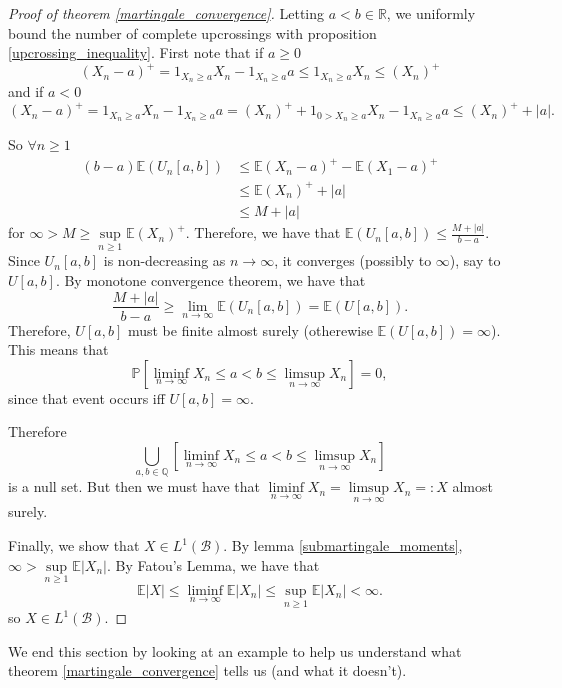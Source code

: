 \begin{proof}[Proof of theorem \ref{martingale_convergence}]
    Letting $a < b \in \mathbb{R}$, we uniformly bound the number of complete upcrossings with proposition \ref{upcrossing_inequality}. First note that if $a \geq 0$ 
    $$(X_{n} - a)^{+} = 1_{X_{n} \geq a}X_{n} -1_{X_{n} \geq a}a \leq 1_{X_{n} \geq a}X_{n} \leq (X_{n})^{+}$$
    and if $a < 0$
    $$(X_{n} - a)^{+} = 1_{X_{n} \geq a}X_{n} -1_{X_{n} \geq a}a = (X_{n})^{+} + 1_{0 > X_{n} \geq a}X_{n} -1_{X_{n} \geq a}a \leq (X_{n})^{+} + |a|.$$

    So $\forall n \geq 1$
    \begin{align*}
        (b - a) \mathbb{E}(U_{n}[a, b]) &\leq \mathbb{E}(X_{n} - a)^{+} - \mathbb{E}(X_{1} - a)^{+}\\
        &\leq \mathbb{E}(X_{n})^{+} + |a|\\
        &\leq M + |a|
    \end{align*}
    for $\infty > M \geq \sup\limits_{n \geq 1} \mathbb{E}(X_{n})^{+}$. Therefore, we have that $\mathbb{E}(U_{n}[a,b]) \leq \frac{M + |a|}{b-a}$. Since $U_{n}[a,b]$ is non-decreasing as $n \to \infty$, it converges (possibly to $\infty$), say to $U[a,b]$. By monotone convergence theorem, we have that 
    $$\frac{M + |a|}{b-a} \geq \lim\limits_{n \to \infty} \mathbb{E}(U_{n}[a,b]) = \mathbb{E}(U[a,b]).$$
    Therefore, $U[a,b]$ must be finite almost surely (otherewise $\mathbb{E}(U[a,b]) = \infty$). This means that
    $$\mathbb{P}[\liminf\limits_{n \to \infty} X_{n} \leq a < b \leq \limsup\limits_{n \to \infty} X_{n}] = 0,$$
    since that event occurs iff $U[a,b] = \infty$.

    Therefore
    $$\bigcup\limits_{a, b \in \mathbb{Q}} [\liminf\limits_{n \to \infty} X_{n} \leq a < b \leq \limsup\limits_{n \to \infty} X_{n}]$$
    is a null set. But then we must have that $\liminf\limits_{n \to \infty} X_{n} = \limsup\limits_{n \to \infty} X_{n} =: X$ almost surely.

    Finally, we show that $X \in L^{1}(\mathcal{B})$. By lemma \ref{submartingale_moments}, $\infty > \sup\limits_{n \geq 1} \mathbb{E}|X_{n}|$. By Fatou's Lemma, we have that
    $$\mathbb{E}|X| \leq \liminf\limits_{n \to \infty} \mathbb{E}|X_{n}| \leq \sup\limits_{n \geq 1} \mathbb{E}|X_{n}| < \infty.$$
    so $X \in L^{1}(\mathcal{B})$.
\end{proof}

We end this section by looking at an example to help us understand what theorem \ref{martingale_convergence} tells us (and what it doesn't).

